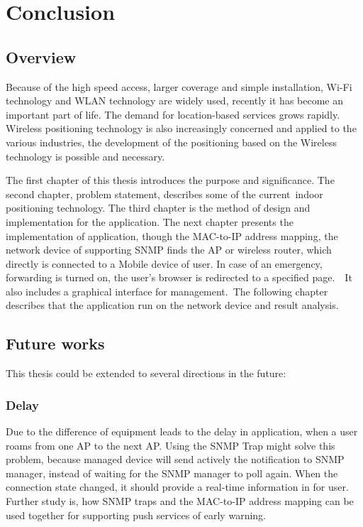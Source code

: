 \newpage
\chapter{Conclusion}

\section{Overview}

Because of the high speed access, larger coverage and simple installation, Wi-Fi technology and WLAN technology are widely used, recently it has become an important part of life. The demand for location-based services grows rapidly. Wireless positioning technology is also increasingly concerned and applied to the various industries, the development of the positioning based on the Wireless technology is possible and necessary.

The first chapter of this thesis introduces the purpose and significance. The second chapter, problem statement, describes some of the current indoor positioning technology. The third chapter is the method of design and implementation for the application. The next chapter presents the implementation of application, though the MAC-to-IP address mapping, the network device of supporting SNMP finds the AP or wireless router, which directly is connected to a Mobile device of user. In case of an emergency, forwarding is turned on, the user's browser is redirected to a specified page.  It also includes a graphical interface for management. The following chapter describes that the application run on the network device and result analysis.

\section{Future works}

This thesis could be extended to several directions in the future:

\subsection{Delay}

Due to the difference of equipment leads to the delay in application, when a user roams from one AP to the next AP. Using the SNMP Trap might solve this problem, because managed device will send actively the notification to SNMP manager, instead of waiting for the SNMP manager to poll again. When the connection state changed, it should provide a real-time information in\cite{CISCOSystems2006} for user. Further study is, how SNMP traps and the MAC-to-IP address mapping can be used together for supporting push services of early warning.

